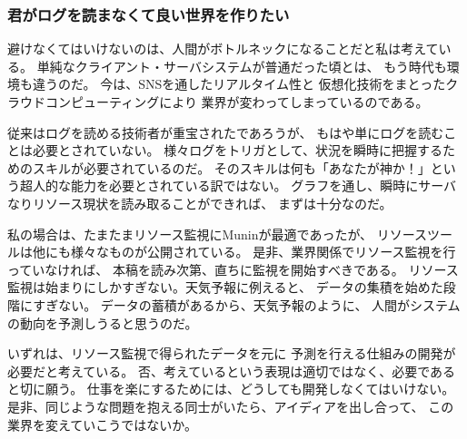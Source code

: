 \subsubsection{君がログを読まなくて良い世界を作りたい}
避けなくてはいけないのは、人間がボトルネックになることだと私は考えている。
単純なクライアント・サーバシステムが普通だった頃とは、
もう時代も環境も違うのだ。
今は、SNSを通したリアルタイム性と
仮想化技術をまとったクラウドコンピューティングにより
業界が変わってしまっているのである。

従来はログを読める技術者が重宝されたであろうが、
もはや単にログを読むことは必要とされていない。
様々ログをトリガとして、状況を瞬時に把握するためのスキルが必要されているのだ。
そのスキルは何も「あなたが神か！」という超人的な能力を必要とされている訳ではない。
グラフを通し、瞬時にサーバなりリソース現状を読み取ることができれば、
まずは十分なのだ。

私の場合は、たまたまリソース監視にMuninが最適であったが、
リソースツールは他にも様々なものが公開されている。
是非、業界関係でリソース監視を行っていなければ、
本稿を読み次第、直ちに監視を開始すべきである。
リソース監視は始まりにしかすぎない。天気予報に例えると、
データの集積を始めた段階にすぎない。
データの蓄積があるから、天気予報のように、
人間がシステムの動向を予測しうると思うのだ。

いずれは、リソース監視で得られたデータを元に
予測を行える仕組みの開発が必要だと考えている。
否、考えているという表現は適切ではなく、必要であると切に願う。
仕事を楽にするためには、どうしても開発しなくてはいけない。
是非、同じような問題を抱える同士がいたら、アイディアを出し合って、
この業界を変えていこうではないか。


